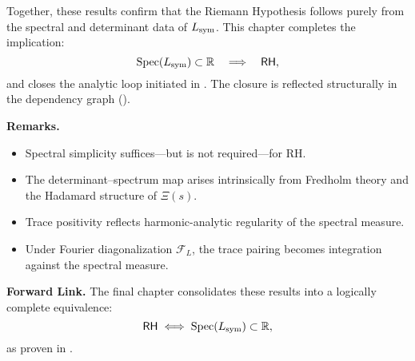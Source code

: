 \medskip

Together, these results confirm that the Riemann Hypothesis follows purely from the spectral and determinant data of \( L_{\mathrm{sym}} \). This chapter completes the implication:
\[
\operatorname{Spec}(L_{\mathrm{sym}}) \subset \mathbb{R} \quad \Longrightarrow \quad \mathsf{RH},
\]
and closes the analytic loop initiated in . The closure is reflected structurally in the dependency graph ().

\medskip

\noindent
\textbf{Remarks.}
\begin{itemize}
  \item Spectral simplicity suffices—but is not required—for RH.
  \item The determinant–spectrum map arises intrinsically from Fredholm theory and the Hadamard structure of \( \Xi(s) \).
  \item Trace positivity reflects harmonic-analytic regularity of the spectral measure.
  \item Under Fourier diagonalization \( \mathcal{F}_L \), the trace pairing becomes integration against the spectral measure.
\end{itemize}

\medskip

\noindent
\textbf{Forward Link.}  
The final chapter consolidates these results into a logically complete equivalence:
\[
\mathsf{RH} \iff \operatorname{Spec}(L_{\mathrm{sym}}) \subset \mathbb{R},
\]
as proven in .
